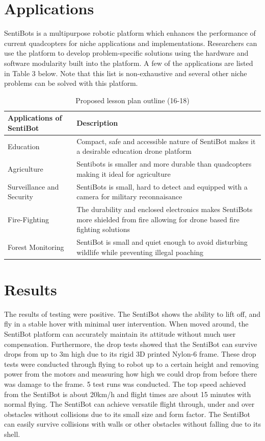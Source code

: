 \documentclass[12pt]{article}
\begin{document}
\section{Applications}

SentiBots is a multipurpose robotic platform which enhances the performance of current quadcopters for niche applications and implementations. Researchers can use the platform to develop problem-specific solutions using the hardware and software modularity built into the platform. A few of the applications are listed in Table 3 below. Note that this list is non-exhaustive and several other niche problems can be solved with this platform.

\begin{table}[h]
	\centering
	\begin{tabularx}{\linewidth}{ | >{\setlength\hsize{.3\hsize}} X | >{\setlength\hsize{.5\hsize}} X }
		Applications of SentiBot & Description \\
		\hline
		Education & Compact, safe and accessible nature of SentiBot makes it a desirable education drone platform \\
		Agriculture &  Sentibots is smaller and more durable than quadcopters making it ideal for agriculture \\
		Surveillance and Security & SentiBots is small, hard to detect and equipped with a camera for military reconnaisance  \\
		Fire-Fighting & The durability and enclosed electronics makes SentiBots more shielded from fire allowing for drone based fire fighting solutions \\
		Forest Monitoring & SentiBot is small and quiet enough to avoid disturbing wildlife while preventing illegal poaching \\
	\end{tabularx}
	\caption{Proposed lesson plan outline (16-18)}
	\label{tab:lessonplan1}
\end{table}

\newpage

\section{Results}

The results of testing were positive. The SentiBot shows the ability to lift off, and fly in a stable hover with minimal user intervention. When moved around, the SentiBot platform can accurately maintain its attitude without much user compensation. Furthermore, the drop tests showed that the SentiBot can survive drops from up to 3m high due to its rigid 3D printed Nylon-6 frame. These drop tests were conducted through flying to robot up to a certain height and removing power from the motors and measuring how high we could drop from before there was damage to the frame. 5 test runs was conducted. The top speed achieved from the SentiBot is about 20km/h and flight times are about 15 minutes with normal flying. The SentiBot can achieve versatile flight through, under and over obstacles without collisions due to its small size and form factor. The SentiBot can easily survive collisions with walls or other obstacles without falling due to its shell.
\end{document}
